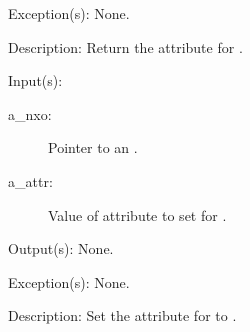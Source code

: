 \begin{capi}
\begin{capilist}
\begin{description}
\begin{description}
			\end{description}
		\end{description}
	\item[Exception(s): ] None.
	\item[Description: ]
		Return the attribute for .
	\end{capilist}
\label{nxo_attr_set}
	\begin{capilist}
	\item[Input(s): ]
		\begin{description}\item[]
		\item[a\_nxo: ]
			Pointer to an .
		\item[a\_attr: ]
			Value of attribute to set for .
		\end{description}
	\item[Output(s): ] None.
	\item[Exception(s): ] None.
	\item[Description: ]
		Set the attribute for  to .
	\end{capilist}
\end{capi}

